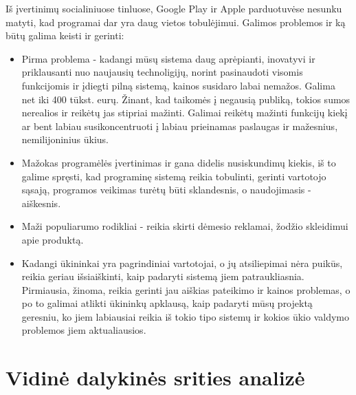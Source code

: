 \documentclass[oneside]{VUMIFPSkursinis}
\begin{document}
Iš įvertinimų socialiniuose tinluose, Google Play ir Apple parduotuvėse nesunku matyti, kad programai dar yra daug vietos tobulėjimui. Galimos problemos ir ką būtų galima keisti ir gerinti:
\begin{itemize}
\item Pirma problema -  kadangi mūsų sistema daug aprėpianti, inovatyvi ir priklausanti nuo naujausių technoligijų, norint pasinaudoti visomis funkcijomis ir įdiegti pilną sistemą, kainos susidaro labai nemažos. Galima net iki 400 tūkst. eurų. Žinant, kad taikomės į negausią publiką, tokios sumos nerealios ir reikėtų jas stipriai mažinti. Galimai reikėtų mažinti funkcijų kiekį ar bent labiau susikoncentruoti į labiau prieinamas paslaugas ir mažesnius, nemilijoninius ūkius.
\item Mažokas programėlės įvertinimas ir gana didelis nusiskundimų kiekis, iš to galime spręsti, kad programinę sistemą reikia tobulinti, gerinti vartotojo sąsają, programos veikimas turėtų būti sklandesnis, o naudojimasis - aiškesnis.
\item Maži populiarumo rodikliai - reikia skirti dėmesio reklamai, žodžio skleidimui apie produktą.
\item Kadangi ūkininkai yra pagrindiniai vartotojai, o jų atsiliepimai nėra puikūs, reikia geriau išsiaiškinti, kaip padaryti sistemą jiem patraukliasnia. Pirmiausia, žinoma, reikia gerinti jau aiškias pateikimo ir kainos problemas, o po to galimai atlikti ūkininkų apklausą, kaip padaryti mūsų projektą geresniu, ko jiem labiausiai reikia iš tokio tipo sistemų ir kokios ūkio valdymo problemos jiem aktualiausios.
\end{itemize}
	
	
	
\section{Vidinė dalykinės srities analizė}
\end{document}
